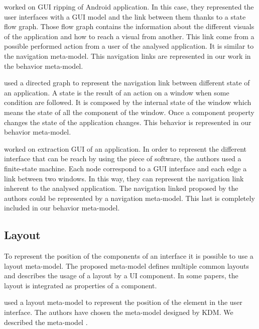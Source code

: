 \documentclass[conference]{IEEEtran}
\begin{document}
\citet{amalfitano2012using} worked on GUI ripping of Android application.
In this case, they represented the user interfaces with a GUI model and the link
    between them thanks to a state flow graph.
Those flow graph contains the information about the different visuals of the application and how to reach
    a visual from another.
This link come from a possible performed action from a user of the analysed application.
It is similar to the navigation meta-model.
This navigation links are represented in our work in the behavior meta-model.

\citet{silva2010guisurfer} used a directed graph to represent the navigation link between different state of an application.
A state is the result of an action on a window when some condition are followed.
It is composed by the internal state of the window which means the state of all the component of the window.
Once a component property changes the state of the application changes.
This behavior is represented in our behavior meta-model.

\citet{aho2013industrial} worked on extraction GUI of an application.
In order to represent the different interface that can be reach
    by using the piece of software, 
    the authors used a finite-state machine.
Each node correspond to a GUI interface and each edge a link between two windows.
In this way, they can represent the navigation link inherent to the analysed application.
The navigation linked proposed by the authors could be represented
    by a navigation meta-model.
This last is completely included in our behavior meta-model.

\subsection{Layout}
\label{sec:layout}

To represent the position of the components of an interface
    it is possible to use a layout meta-model.
The proposed meta-model defines multiple common layouts and
    describes the usage of a layout by a UI component.
In some papers, the layout is integrated as properties of a component.

\citet{gotti2016java} used a layout meta-model to represent
    the position of the element in the user interface.
The authors have chosen the meta-model designed by KDM.
We described the meta-model .
\end{document}
